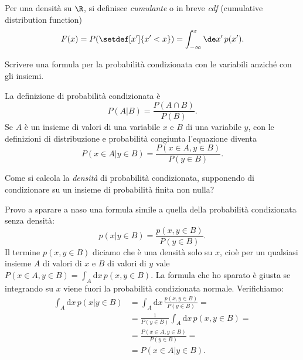 \begin{definition}[Cumulante]
	Per una densità su $\R$, si definisce \emph{cumulante} o in breve \emph{cdf} (cumulative distribution function)
	\begin{equation*}
		F(x) = P(\setdef[x']{x'<x}) = \int_{-\infty}^x \de x'\,p(x').
	\end{equation*}
\end{definition}

\begin{exercise}
    Scrivere una formula per la probabilità condizionata con le variabili
    anziché con gli insiemi.
\end{exercise}
%
\begin{solution}
    La definizione di probabilità condizionata è
    \begin{equation*}
        P(A|B) = \frac{P(A \cap B)}{P(B)}.
    \end{equation*}
    Se $A$ è un insieme di valori di una variabile $x$ e $B$ di una variabile
    $y$, con le definizioni di distribuzione e probabilità congiunta
    l'equazione diventa
    \begin{equation*}
        P(x \in A|y \in B) = \frac{P(x \in A, y \in B)}{P(y \in B)}.
    \end{equation*}
\end{solution}
%
\begin{exercise}
    Come si calcola la \emph{densità} di probabilità condizionata, supponendo
    di condizionare su un insieme di probabilità finita non nulla?
\end{exercise}
%
\begin{solution}
    Provo a sparare a naso una formula simile a quella della probabilità
    condizionata senza densità:
    \begin{equation*}
        p(x|y \in B) = \frac{p(x, y \in B)}{P(y \in B)}.
    \end{equation*}
    Il termine $p(x, y \in B)$ diciamo che è una densità solo su $x$, cioè
    per un qualsiasi insieme $A$ di valori di $x$ e $B$ di valori di $y$ vale
    $P(x \in A, y \in B) = \int_A \mathrm dx\, p(x, y \in B)$.
    La formula che ho sparato è giusta se integrando su $x$ viene fuori la
    probabilità condizionata normale. Verifichiamo:
    \begin{align*}
        \int_A \mathrm dx\, p(x|y \in B) &=
        \int_A \mathrm dx\, \frac{p(x, y \in B)}{P(y \in B)} = \\
        &= \frac1{P(y \in B)} \int_A \mathrm dx\, p(x, y \in B) = \\
        &= \frac{P(x \in A, y \in B)}{P(y \in B)} = \\
        &= P(x \in A|y \in B).
    \end{align*}
\end{solution}
